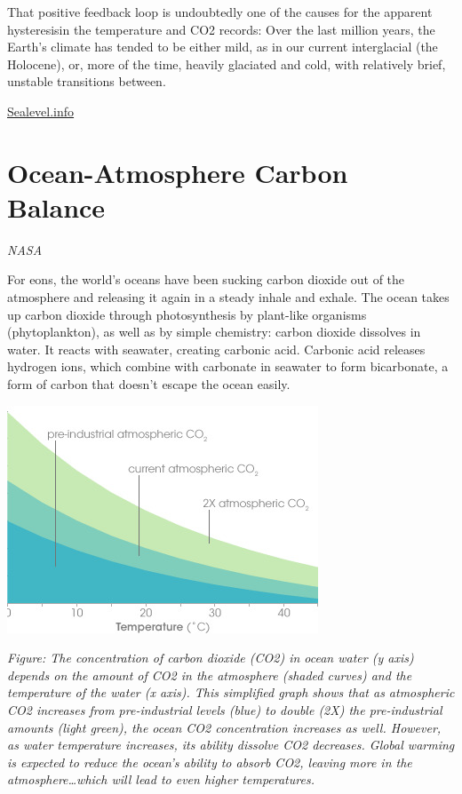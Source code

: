 \documentclass[
]{book}
\begin{document}
That positive feedback loop is undoubtedly one of the causes for the apparent hysteresisin the temperature and CO2 records: Over the last million years, the Earth's climate has tended to be either mild, as in our current interglacial (the Holocene), or, more of the time, heavily glaciated and cold, with relatively brief, unstable transitions between.

\href{https://sealevel.info/atmospheric_co2_increase_is_not_from_ocean_outgassing.html}{Sealevel.info}

\hypertarget{ocean-atmosphere-carbon-balance}{%
\section{Ocean-Atmosphere Carbon Balance}\label{ocean-atmosphere-carbon-balance}}

\emph{NASA}

For eons, the world's oceans have been sucking carbon dioxide out of the atmosphere and releasing it again in a steady inhale and exhale. The ocean takes up carbon dioxide through photosynthesis by plant-like organisms (phytoplankton), as well as by simple chemistry: carbon dioxide dissolves in water. It reacts with seawater, creating carbonic acid. Carbonic acid releases hydrogen ions, which combine with carbonate in seawater to form bicarbonate, a form of carbon that doesn't escape the ocean easily.

\includegraphics{fig/ocean_carbon_uptake.jpg}

\emph{Figure: The concentration of carbon dioxide (CO2) in ocean water (y axis) depends on the amount of CO2 in the atmosphere (shaded curves) and the temperature of the water (x axis). This simplified graph shows that as atmospheric CO2 increases from pre-industrial levels (blue) to double (2X) the pre-industrial amounts (light green), the ocean CO2 concentration increases as well. However, as water temperature increases, its ability dissolve CO2 decreases. Global warming is expected to reduce the ocean's ability to absorb CO2, leaving more in the atmosphere\ldots which will lead to even higher temperatures.}
\end{document}
